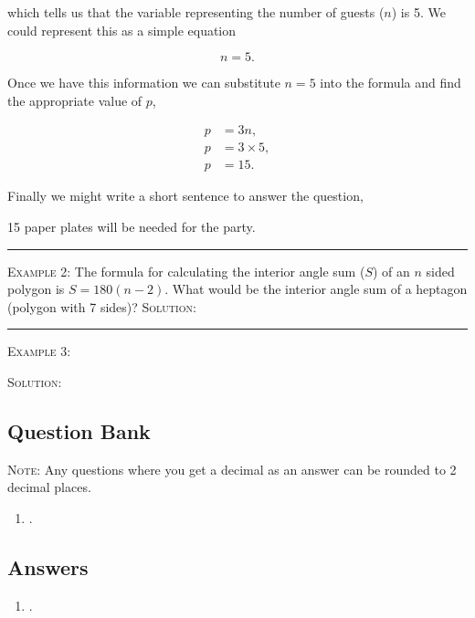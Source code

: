 \documentclass[a4paper,12pt]{article}
\begin{document}
which tells us that the variable representing the number 
of guests ($n$) is 5. We could represent this as a simple equation

$$n = 5.$$

Once we have this information we can substitute $n = 5$ into 
the formula and find the appropriate value of $p$,

\begin{align*}
p &= 3n, \\
p &= 3\times 5, \\
p &= 15.
\end{align*}

Finally we might write a short sentence to answer the question,

\begin{displayquote}
15 paper plates will be needed for the party.
\end{displayquote}

\vspace{3mm}
\hrule
\vspace{3mm}

\textsc{Example 2}: The formula for calculating the interior 
angle sum ($S$) of an $n$ sided polygon is $S = 180(n - 2)$.
What would be the interior angle sum of a heptagon (polygon with
7 sides)?
\textsc{Solution}: 

\vspace{3mm}
\hrule
\vspace{3mm}

\textsc{Example 3}: 

\textsc{Solution}: 

\newpage
\subsection*{Question Bank}

\textsc{Note}: Any questions where you get a decimal as an answer
can be rounded to 2 decimal places.

\begin{enumerate}
\item .

\end{enumerate}

\newpage
\subsection*{Answers}

\begin{enumerate}
\item .
\end{enumerate}
\end{document}
